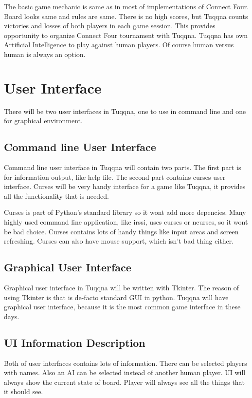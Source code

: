 \documentclass[gradu,emptyfirstpagenumber]{tktltiki}
\begin{document}
The basic game mechanic is same as in most of implementations of Connect Four.
Board looks same and rules are same. There is no high scores, but Tuqqna counts
victories and losses of both players in each game session. This provides
opportunity to organize Connect Four tournament with Tuqqna. Tuqqna has own
Artificial Intelligence to play against human players. Of course human versus
human is always an option.

\pagebreak

\section{User Interface}

There will be two user interfaces in Tuqqna, one to use in command line and one
for graphical environment.

\subsection{Command line User Interface}

Command line user interface in Tuqqna will contain two parts. The first part is
for information output, like help file. The second part contains curses user
interface. Curses will be very handy interface for a game like Tuqqna, it
provides all the functionality that is needed.

Curses is part of Python's standard library so it wont add more depencies. Many
highly used command line application, like irssi, uses curses or ncurses, so it
wont be bad choice. Curses contains lots of handy things like input areas and
screen refreshing. Curses can also have mouse support, which isn't bad thing
either.

\subsection{Graphical User Interface}

Graphical user interface in Tuqqna will be written with Tkinter. The reason of
using Tkinter is that is de-facto standard GUI in python. Tuqqna will have
graphical user interface, because it is the most common game interface in these
days.

\subsection{UI Information Description}

Both of user interfaces contains lots of information. There can be selected
players with names. Also an AI can be selected instead of another human player.
UI will always show the current state of board. Player will always see all the
things that it should see.
\end{document}
